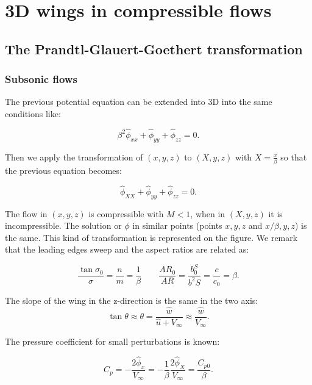 
\chapter{3D wings in compressible flows}
\section{The Prandtl-Glauert-Goethert transformation}
\subsection{Subsonic flows}
	The previous potential equation can be extended into 3D into the same conditions like: 
	
	\begin{equation}
	\beta ^2 \hat{\phi} _{xx} + \hat{\phi} _{yy} + \hat{\phi} _{zz} = 0.
	\end{equation}
	
	Then we apply the transformation of $(x, y, z)$ to $(X, y, z)$ with $X = \frac{x}{\beta}$ so that the previous equation becomes: 
	
	\begin{equation}
	\hat{\phi} _{XX} + \hat{\phi} _{yy} + \hat{\phi} _{zz} = 0.
	\end{equation}
	
	The flow in $(x,y,z)$ is compressible with $M<1$, when in $(X,y,z)$ it is incompressible. The solution or $\phi$ in similar points (points $x,y,z$ and $x/\beta,y,z$) is the same. This kind of transformation is represented on the figure. We remark that the leading edges sweep and the aspect ratios are related as: 
	
	\begin{equation}
	\frac{\tan \sigma _0}{\sigma} = \frac{n}{m} = \frac{1}{\beta} \qquad \frac{AR_0}{AR} = \frac{b^S_0}{b^2S} = \frac{c}{c_0} = \beta. 
	\end{equation}
	
	The slope of the wing in the z-direction is the same in the two axis: 
	\begin{equation}
	\tan \theta \approx \theta = \frac{\hat{w}}{\hat{u}+V_\infty} \approx \frac{\hat{w}}{V_\infty}. 
	\end{equation}
	
	The pressure coefficient for small perturbations is known: 
	
	\begin{equation}
	C_p = -\frac{2\hat{\phi}_{x}}{V_\infty} = -\frac{1}{\beta}\frac{2\hat{\phi}_{X}}{V_\infty} = \frac{C_{p0}}{\beta}.
	\end{equation}
	
